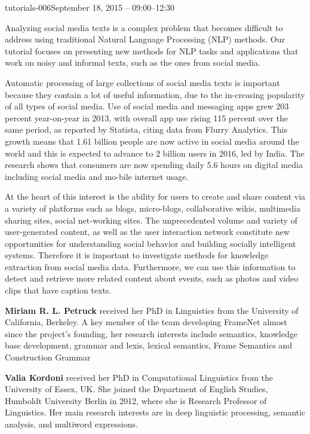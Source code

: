 \begin{tutorial}{tutorials-006}{September 18, 2015 -- 09:00--12:30}
{\TutLocF}

Analyzing social media texts is a complex problem that becomes difficult
to address using traditional Natural Language Processing (NLP) methods.
Our tutorial focuses on presenting new methods for NLP tasks and applications
that work on noisy and informal texts, such as the ones from social
media.

Automatic processing of large collections of social media texts is
important because they contain a lot of useful information, due to
the in-creasing popularity of all types of social media. Use of social
media and messaging apps grew 203 percent year-on-year in 2013, with
overall app use rising 115 percent over the same period, as reported
by Statista, citing data from Flurry Analytics. This growth means
that 1.61 billion people are now active in social media around the
world and this is expected to advance to 2 billion users in 2016,
led by India. The research shows that consumers are now spending daily
5.6 hours on digital media including social media and mo-bile internet
usage.

At the heart of this interest is the ability for users to create and
share content via a variety of platforms such as blogs, micro-blogs,
collaborative wikis, multimedia sharing sites, social net-working
sites. The unprecedented volume and variety of user-generated content,
as well as the user interaction network constitute new opportunities
for understanding social behavior and building socially intelligent
systems. Therefore it is important to investigate methods for knowledge
extraction from social media data. Furthermore, we can use this information
to detect and retrieve more related content about events, such as
photos and video clips that have caption texts.

\end{tutorial} 

\clearpage{}

\begin{bio}

\textbf{Miriam R. L. Petruck} received her PhD in Linguistics from
the University of California, Berkeley. A key member of the team developing
FrameNet almost since the project’s founding, her research interests
include semantics, knowledge base development, grammar and lexis,
lexical semantics, Frame Semantics and Construction Grammar

\textbf{Valia Kordoni} received her PhD in Computational Linguistics
from the University of Essex, UK. She joined the Department of English
Studies, Humboldt University Berlin in 2012, where she is Research
Professor of Linguistics. Her main research interests are in deep
linguistic processing, semantic analysis, and multiword expressions.

  

\end{bio}

